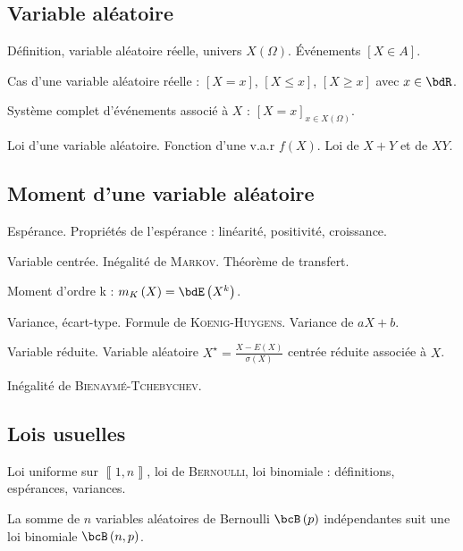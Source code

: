 \documentclass[a4paper,french,bookmarks]{article}
\begin{document}
    \subsection*{Variable aléatoire}
    
    \begin{enumerate}
        \ithand Définition, variable aléatoire réelle, univers $X\left(\Omega\right)$.
        Événements $\left[X \in A\right]$.
        
        \ithand Cas d'une variable aléatoire réelle : $\left[X = x\right]$,
        $\left[X \leq x\right]$, $\left[X \geq x\right]$ avec $x \in \bdR$.
        
        \ithand  Système complet d'événements associé à $X$ : 
        $\left[X = x\right]_{x \in X\left(\Omega\right)}$.
        
        \ithand Loi d'une variable aléatoire. Fonction d'une v.a.r $f\left(X\right)$. Loi de
        $X + Y$ et de $XY$.
    \end{enumerate}
    
    \subsection*{Moment d'une variable aléatoire}
    
    \begin{enumerate}
        \ithand Espérance. Propriétés de l'espérance : linéarité, positivité, croissance.
        
        \ithand Variable centrée. Inégalité de \textsc{Markov}. Théorème de transfert. 
        
        \ithand Moment d'ordre k : $m_K\left(X\right) = \bdE\left(X^k\right)$.
        
        \ithand Variance, écart-type. Formule de \textsc{Koenig}-\textsc{Huygens}. 
        Variance de $aX + b$.
        
        \ithand Variable réduite. Variable aléatoire $X^\star = 
        \frac{X - E\left(X\right)}{\sigma\left(X\right)}$ centrée réduite associée à $X$.
        
        \ithand Inégalité de \textsc{Bienaymé}-\textsc{Tchebychev}.
    \end{enumerate}
    
    \subsection*{Lois usuelles}
    
    \begin{enumerate}
        \ithand Loi uniforme sur $\left\llbracket1, n\right\rrbracket$, loi de
        \textsc{Bernoulli}, loi binomiale : définitions, espérances, variances.
        
        \ithand La somme de $n$ variables aléatoires de Bernoulli $\bcB\left(p\right)$
        indépendantes suit une loi binomiale $\bcB\left(n, p\right)$.

    \end{enumerate}
    
\end{document}
